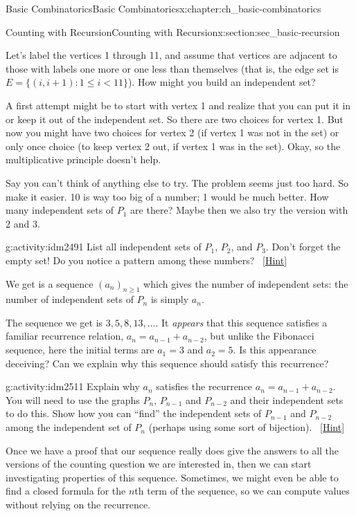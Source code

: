 \documentclass[oneside,10pt,]{book}
\numberwithin{equation}{chapter}
\def\st{:}
\newcommand{\lt}{<}
\begin{document}
\begin{chapterptx}{Basic Combinatorics}{}{Basic Combinatorics}{}{}{x:chapter:ch_basic-combinatorics}
\begin{sectionptx}{Counting with Recursion}{}{Counting with Recursion}{}{}{x:section:sec_basic-recursion}
\begin{introduction}{}
\par
Let's label the vertices 1 through 11, and assume that vertices are adjacent to those with labels one more or one less than themselves (that is, the edge set is \(E = \{(i,i+1) \st 1 \le i \lt 11\}\)).  How might you build an independent set?%
\par
A first attempt might be to start with vertex 1 and realize that you can put it in or keep it out of the independent set.  So there are two choices for vertex 1.  But now you might have two choices for vertex 2 (if vertex 1 was not in the set) or only once choice (to keep vertex 2 out, if vertex 1 was in the set).  Okay, so the multiplicative principle doesn't help.%
\par
Say you can't think of anything else to try.  The problem seems just too hard.  So make it easier.  10 is way too big of a number; 1 would be much better.  How many independent sets of \(P_1\) are there?  Maybe then we also try the version with 2 and 3.%
\begin{activity}{}{g:activity:idm2491}%
List all independent sets of \(P_1\), \(P_2\), and \(P_3\).  Don't forget the empty set! Do you notice a pattern among these numbers?%
\qquad~\hfill{\tiny\hyperlink{g:hint:idm2497-back}{[Hint]}}\end{activity}
We get is a sequence \((a_n)_{n \ge 1}\) which gives the number of independent sets: the number of independent sets of \(P_n\) is simply \(a_n\).%
\par
The sequence we get is \(3, 5, 8, 13, \ldots\).  It \emph{appears} that this sequence satisfies a familiar recurrence relation, \(a_n = a_{n-1} + a_{n-2}\), but unlike the Fibonacci sequence, here the initial terms are \(a_1 = 3\) and \(a_2 = 5\).  Is this appearance deceiving?  Can we explain why this sequence should satisfy this recurrence?%
\begin{activity}{}{g:activity:idm2511}%
Explain why \(a_n\) satisfies the recurrence \(a_n = a_{n-1} + a_{n-2}\).  You will need to use the graphs \(P_n\), \(P_{n-1}\) and \(P_{n-2}\) and their independent sets to do this.  Show how you can ``find'' the independent sets of \(P_{n-1}\) and \(P_{n-2}\) among the independent set of \(P_{n}\) (perhaps using some sort of bijection).%
\qquad~\hfill{\tiny\hyperlink{g:hint:idm2523-back}{[Hint]}}\end{activity}
Once we have a proof that our sequence really does give the answers to all the versions of the counting question we are interested in, then  we can start investigating properties of this sequence.  Sometimes, we might even be able to find a closed formula for the \(n\)th term of the sequence, so we can compute values without relying on the recurrence.%

\end{introduction}
\end{sectionptx}
\end{chapterptx}
\end{document}
